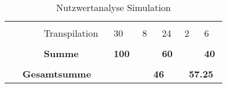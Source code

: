 \documentclass[main.tex]{subfiles} %
\begin{document}
\begin{table}[ht]
\begin{tabular}{|p{0.14\linewidth}|p{0.15\linewidth}|p{0.115\linewidth}|p{0.08\linewidth}|p{0.09\linewidth}|p{0.08\linewidth}|p{0.09\linewidth}|}
        \cline{2-7}
        &&&&&&\\[-9pt]
        & Transpilation & 30 & 8 & 24 & 2 & 6 \\[1pt]
        \cline{2-7}
        &&&&&&\\[-9pt]
        & \textbf{Summe} & \textbf{100} &  & \textbf{60} &  & \textbf{40} \\[1pt]
        \hline
        \hline
        \multicolumn{2}{|c|}{} &&\multicolumn{2}{c|}{}&\multicolumn{2}{c|}{} \\[-9pt]
        \multicolumn{2}{|c|}{\textbf{Gesamtsumme}} &  & \multicolumn{2}{c|}{\textbf{46}} & \multicolumn{2}{c|}{\textbf{57.25}} \\[1pt]
        \hline
        \end{tabular}
    \caption{Nutzwertanalyse Simulation}
\end{table}
\end{document}
